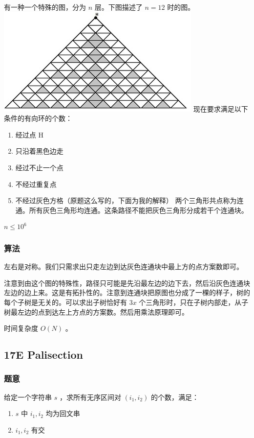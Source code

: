 \documentclass[11pt]{article}
\begin{document}
    有一种一个特殊的图，分为 $n$ 层。下图描述了 $n = 12$ 时的图。
\includegraphics{pic/15E.png}
    现在要求满足以下条件的有向环的个数：
\begin{enumerate}
\item 经过点 H
\item 只沿着黑色边走
\item 经过不止一个点
\item 不经过重复点
\item 不经过灰色方格（原题这么写的，下面为我的解释）
         两个三角形共点称为连通。所有灰色三角形均连通。这条路径不能把灰色三角形分成若干个连通块。
\end{enumerate}

    $n \leq 10^6$
\subsubsection{算法}
\label{sec-1-5-2}

    左右是对称。我们只需求出只走左边到达灰色连通块中最上方的点方案数即可。

    注意到由这个图的特殊性，路径只可能是先沿最左边的边下去，然后沿灰色连通块左边的边上来。这是有拓扑性的。注意到连通块把原图也分成了一棵的样子，树的每个子树是无关的。可以求出子树恰好有 $3x$ 个三角形时，只在子树内部走，从子树最左边的点到达左上方点的方案数。然后用乘法原理即可。

    时间复杂度 $O(N)$ 。
\subsection{17E   Palisection}
\label{sec-1-6}
\subsubsection{题意}
\label{sec-1-6-1}

    给定一个字符串 $s$ ，求所有无序区间对 $(i_1, i_2)$ 的个数，满足：
\begin{enumerate}
\item $s$ 中 $i_1, i_2$ 均为回文串
\item $i_1, i_2$ 有交
\end{enumerate}
\end{document}
